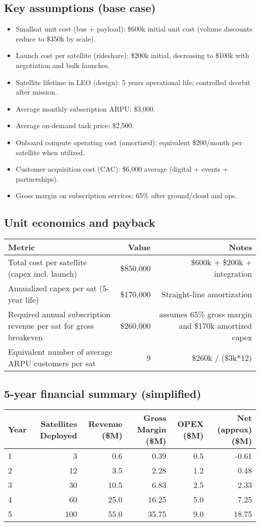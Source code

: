 \subsection{Key assumptions (base case)}
\begin{itemize}
  \item Smallsat unit cost (bus + payload): \$600k initial unit cost (volume discounts reduce to \$350k by scale).
  \item Launch cost per satellite (rideshare): \$200k initial, decreasing to \$100k with negotiation and bulk launches.
  \item Satellite lifetime in LEO (design): 5 years operational life; controlled deorbit after mission.
  \item Average monthly subscription ARPU: \$3,000.
  \item Average on-demand task price: \$2,500.
  \item Onboard compute operating cost (amortized): equivalent \$200/month per satellite when utilized.
  \item Customer acquisition cost (CAC): \$6,000 average (digital + events + partnerships).
  \item Gross margin on subscription services: 65\% after ground/cloud and ops.
\end{itemize}

\subsection{Unit economics and payback}
\begin{tabularx}{\textwidth}{X r r}
\toprule
Metric & Value & Notes \\
\midrule
Total cost per satellite (capex incl. launch) & \$850,000 & \$600k + \$200k + integration \\
Annualized capex per sat (5-year life) & \$170,000 & Straight-line amortization \\
Required annual subscription revenue per sat for gross breakeven & \$260,000 & assumes 65\% gross margin and \$170k amortized capex \\
Equivalent number of average ARPU customers per sat & 9 & \$260k / (\$3k*12) \\
\bottomrule
\end{tabularx}

\subsection{5-year financial summary (simplified)}
\begin{tabularx}{\textwidth}{l r r r r r}
\toprule
Year & Satellites Deployed & Revenue (\$M) & Gross Margin (\$M) & OPEX (\$M) & Net (approx) (\$M) \\
\midrule
1 & 3 & 0.6 & 0.39 & 0.5 & -0.61 \\
2 & 12 & 3.5 & 2.28 & 1.2 & 0.48 \\
3 & 30 & 10.5 & 6.83 & 2.5 & 2.33 \\
4 & 60 & 25.0 & 16.25 & 5.0 & 7.25 \\
5 & 100 & 55.0 & 35.75 & 9.0 & 18.75 \\
\bottomrule
\end{tabularx}

